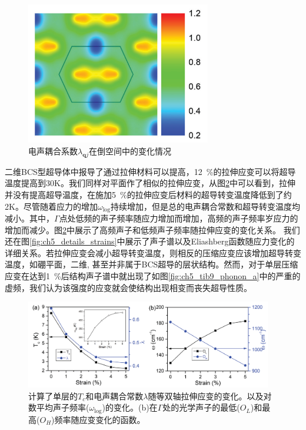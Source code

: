 \begin{figure}
  \includegraphics[width=0.72\textwidth]{figs/ch5_tib7_coupling.png}
  \centering
  \caption{电声耦合系数$\lambda_{\bm{q}j}$在倒空间中的变化情况}
  \label{fig:ch5_tib7_coupling}
\end{figure}

二维BCS型超导体中报导了通过拉伸材料可以提高，\SI{12}{\percent}的拉伸应变可以将超导温度提高到30K。我们同样对平面作了相似的拉伸应变，从图\ref{fig:ch5_tib7_strain}中可以看到，拉伸并没有提高超导温度，在施加\SI{5}{\percent}的拉伸应变后材料的超导转变温度降低到了约2K。尽管随着应力的增加$\omega_\mathrm{log}$持续增加，但是总的电声耦合常数和超导转变温度均减小。其中，$\Gamma$点处低频的声子频率随应力增加而增加，高频的声子频率岁应力的增加而减少。图\ref{fig:ch5_tib7_strain}中展示了高频声子和低频声子频率随拉伸应变的变化关系。
我们还在图\ref{fig:ch5_details_strains}中展示了声子谱以及Eliashberg函数随应力变化的详细关系。若拉伸应变会减小超导转变温度，则相反的压缩应变应该增加超导转变温度，如硼平面\cite{cheng2017suppressed}，二维\cite{liao2020doping},
甚至并非属于BCS超导的层状结构\cite{nie2009suppression}。然而，对于单层压缩应变在达到\SI{1}{\percent}后结构声子谱中就出现了如图\ref{fig:ch5_tib9_phonon_a}中的严重的虚频，我们认为该强度的应变就会使结构出现相变而丧失超导性质。

\begin{figure}
  \includegraphics[width=0.96\textwidth]{figs/ch5_tib7_strain.png}
  \centering
  \caption{计算了单层的$T_c$和电声耦合常数$\lambda$随等双轴拉伸应变的变化。以及对数平均声子频率($\omega_{\mathrm{log}}$)的变化。(b)在$\Gamma$处的光学声子的最低($O_L$)和最高($O_H$)频率随应变变化的函数。}
  \label{fig:ch5_tib7_strain}
\end{figure}

